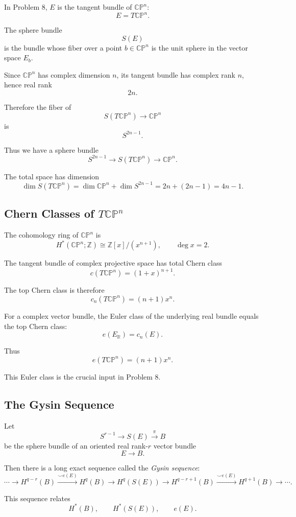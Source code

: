 \documentclass[12pt,a4paper]{article}
\theoremstyle{notespace}
\begin{document}
In Problem 8, \(E\) is the tangent bundle of \(\mathbb{CP}^n\):
\[
E=T\mathbb{CP}^n.
\]

The sphere bundle
\[
S(E)
\]
is the bundle whose fiber over a point \(b\in \mathbb{CP}^n\) is the unit sphere
in the vector space \(E_b\).

Since \(\mathbb{CP}^n\) has complex dimension \(n\), its tangent bundle has
complex rank \(n\), hence real rank
\[
2n.
\]

Therefore the fiber of
\[
S(T\mathbb{CP}^n)\to \mathbb{CP}^n
\]
is
\[
S^{2n-1}.
\]

Thus we have a sphere bundle
\[
S^{2n-1}
\longrightarrow
S(T\mathbb{CP}^n)
\longrightarrow
\mathbb{CP}^n.
\]

The total space has dimension
\[
\dim S(T\mathbb{CP}^n)
=
\dim \mathbb{CP}^n+\dim S^{2n-1}
=
2n+(2n-1)
=
4n-1.
\]

\subsection{Chern Classes of \(T\mathbb{CP}^n\)}

The cohomology ring of \(\mathbb{CP}^n\) is
\[
H^*(\mathbb{CP}^n;\mathbb Z)
\cong
\mathbb Z[x]/(x^{n+1}),
\qquad
\deg x=2.
\]

The tangent bundle of complex projective space has total Chern class
\[
c(T\mathbb{CP}^n)=(1+x)^{n+1}.
\]

The top Chern class is therefore
\[
c_n(T\mathbb{CP}^n)=(n+1)x^n.
\]

For a complex vector bundle, the Euler class of the underlying real bundle equals
the top Chern class:
\[
e(E_{\mathbb R})=c_n(E).
\]

Thus
\[
e(T\mathbb{CP}^n)=(n+1)x^n.
\]

This Euler class is the crucial input in Problem 8.

\subsection{The Gysin Sequence}

Let
\[
S^{r-1}\to S(E)\xrightarrow{\pi} B
\]
be the sphere bundle of an oriented real rank-\(r\) vector bundle
\[
E\to B.
\]

Then there is a long exact sequence called the \emph{Gysin sequence}:
\[
\cdots
\to
H^{q-r}(B)
\xrightarrow{\smile e(E)}
H^q(B)
\to
H^q(S(E))
\to
H^{q-r+1}(B)
\xrightarrow{\smile e(E)}
H^{q+1}(B)
\to
\cdots.
\]

This sequence relates
\[
H^*(B),
\qquad
H^*(S(E)),
\qquad
e(E).
\]
\end{document}
